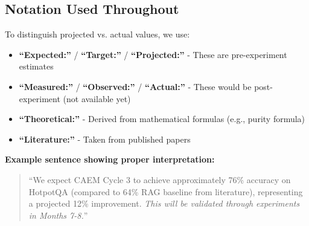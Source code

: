 \documentclass[12pt,a4paper]{article}
\theoremstyle{definition}
\begin{document}
\subsection*{Notation Used Throughout}

To distinguish projected vs. actual values, we use:

\begin{itemize}
    \item \textbf{``Expected:''} / \textbf{``Target:''} / \textbf{``Projected:''} - These are pre-experiment estimates
    \item \textbf{``Measured:''} / \textbf{``Observed:''} / \textbf{``Actual:''} - These would be post-experiment (not available yet)
    \item \textbf{``Theoretical:''} - Derived from mathematical formulas (e.g., purity formula)
    \item \textbf{``Literature:''} - Taken from published papers
\end{itemize}

\textbf{Example sentence showing proper interpretation:}

\begin{quote}
``We expect CAEM Cycle 3 to achieve approximately 76\% accuracy on HotpotQA (compared to 64\% RAG baseline from literature), representing a projected 12\% improvement. \textit{This will be validated through experiments in Months 7-8.}''
\end{quote}

\vspace{1cm}

\begin{center}
\end{center}
\end{document}

